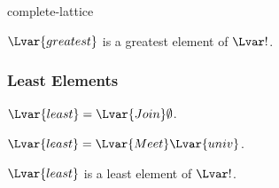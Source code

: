 \documentclass{stex}
\begin{document}
\begin{smodule}{complete-lattice}
\begin{forthel}
    \begin{proposition*}
      ${\Lvar{greatest}}$ is a greatest element of $\Lvar!$.
    \end{proposition*}
  \end{forthel}

  \subsubsection{Least Elements}

  \begin{forthel}
    \begin{definition*}
      ${\Lvar{least}} = {\Lvar{Join}} \emptyset$.
    \end{definition*}

    \begin{proposition*}
      ${\Lvar{least}} = {\Lvar{Meet}} \Lvar{univ}$.
    \end{proposition*}

    \begin{proposition*}
      ${\Lvar{least}}$ is a least element of $\Lvar!$.
    \end{proposition*}
  \end{forthel}
\end{smodule}
\end{document}
